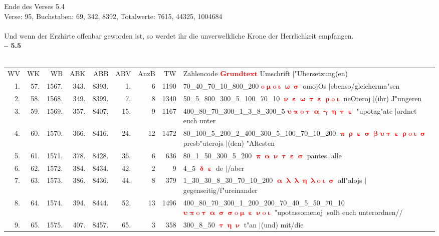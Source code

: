 \documentclass[a4paper,10pt,landscape]{article}
\begin{document}
Ende des Verses 5.4\\
Verse: 95, Buchstaben: 69, 342, 8392, Totalwerte: 7615, 44325, 1004684\\
\\
Und wenn der Erzhirte offenbar geworden ist, so werdet ihr die unverwelkliche Krone der Herrlichkeit empfangen.\\
\newpage 
{\bf -- 5.5}\\
\medskip \\
\begin{tabular}{rrrrrrrrp{120mm}}
WV&WK&WB&ABK&ABB&ABV&AnzB&TW&Zahlencode \textcolor{red}{$\boldsymbol{Grundtext}$} Umschrift $|$"Ubersetzung(en)\\
1.&57.&1567.&343.&8393.&1.&6&1190&70\_40\_70\_10\_800\_200 \textcolor{red}{$\boldsymbol{\mathrm{o}\upmu\mathrm{o}\upiota\upomega\upsigma}$} omojOs $|$ebenso/gleicherma"sen\\
2.&58.&1568.&349.&8399.&7.&8&1340&50\_5\_800\_300\_5\_100\_70\_10 \textcolor{red}{$\boldsymbol{\upnu\upepsilon\upomega\uptau\upepsilon\uprho\mathrm{o}\upiota}$} neOteroj $|$(ihr) J"ungeren\\
3.&59.&1569.&357.&8407.&15.&9&1167&400\_80\_70\_300\_1\_3\_8\_300\_5 \textcolor{red}{$\boldsymbol{\upsilon\uppi\mathrm{o}\uptau\upalpha\upgamma\upeta\uptau\upepsilon}$} "upotag"ate $|$ordnet euch unter\\
4.&60.&1570.&366.&8416.&24.&12&1472&80\_100\_5\_200\_2\_400\_300\_5\_100\_70\_10\_200 \textcolor{red}{$\boldsymbol{\uppi\uprho\upepsilon\upsigma\upbeta\upsilon\uptau\upepsilon\uprho\mathrm{o}\upiota\upsigma}$} presb"uterojs $|$(den) "Altesten\\
5.&61.&1571.&378.&8428.&36.&6&636&80\_1\_50\_300\_5\_200 \textcolor{red}{$\boldsymbol{\uppi\upalpha\upnu\uptau\upepsilon\upsigma}$} pantes $|$alle\\
6.&62.&1572.&384.&8434.&42.&2&9&4\_5 \textcolor{red}{$\boldsymbol{\updelta\upepsilon}$} de $|$/aber\\
7.&63.&1573.&386.&8436.&44.&8&379&1\_30\_30\_8\_30\_70\_10\_200 \textcolor{red}{$\boldsymbol{\upalpha\uplambda\uplambda\upeta\uplambda\mathrm{o}\upiota\upsigma}$} all"alojs $|$gegenseitig/f"ureinander\\
8.&64.&1574.&394.&8444.&52.&13&1496&400\_80\_70\_300\_1\_200\_200\_70\_40\_5\_50\_70\_10 \textcolor{red}{$\boldsymbol{\upsilon\uppi\mathrm{o}\uptau\upalpha\upsigma\upsigma\mathrm{o}\upmu\upepsilon\upnu\mathrm{o}\upiota}$} "upotassomenoj $|$sollt euch unterordnen//\\
9.&65.&1575.&407.&8457.&65.&3&358&300\_8\_50 \textcolor{red}{$\boldsymbol{\uptau\upeta\upnu}$} t"an $|$(und) mit/die\\

\end{tabular}
\end{document}
